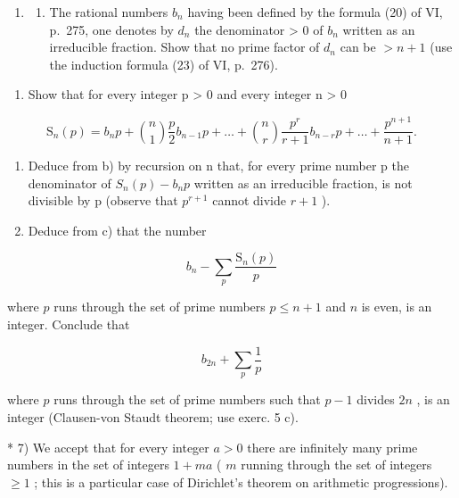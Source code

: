 \begin{enumerate}
\def\labelenumi{\arabic{enumi})}
\setcounter{enumi}{5}
\tightlist
\item
  \begin{enumerate}
  \def\labelenumii{\alph{enumii})}
  \tightlist
  \item
    The rational numbers \(b_{n}\) having been defined by the formula (20) of VI, p.~275, one denotes by \(d_{n}\) the denominator \textgreater{} 0 of \(b_{n}\) written as an irreducible fraction. Show that no prime factor of \(d_{n}\) can be \(> n + 1\) (use the induction formula (23) of VI, p.~276).
  \end{enumerate}
\end{enumerate}

\begin{enumerate}
\def\labelenumi{\alph{enumi})}
\setcounter{enumi}{1}
\tightlist
\item
  Show that for every integer p \textgreater{} 0 and every integer n \textgreater{} 0
\end{enumerate}

\[
\mathrm{S} _ {n} (p) = b _ {n} p + \binom {n} {1} \frac {p}{2} b _ {n - 1} p + \dots + \binom {n} {r} \frac {p ^ {r}}{r + 1} b _ {n - r} p + \dots + \frac {p ^ {n + 1}}{n + 1}.
\]

\begin{enumerate}
\def\labelenumi{\alph{enumi})}
\setcounter{enumi}{2}
\item
  Deduce from b) by recursion on n that, for every prime number p the denominator of \(S_{n}(p) - b_{n}p\) written as an irreducible fraction, is not divisible by p (observe that \(p^{r+1}\) cannot divide \(r + 1\) ).
\item
  Deduce from c) that the number
\end{enumerate}

\[
b _ {n} - \sum_ {p} \frac {\mathrm{S} _ {n} (p)}{p}
\]

where \(p\) runs through the set of prime numbers \(p \leqslant n + 1\) and \(n\) is even, is an integer. Conclude that

\[
b _ {2 n} + \sum_ {p} \frac {1}{p}
\]

where \(p\) runs through the set of prime numbers such that \(p - 1\) divides \(2n\) , is an integer (Clausen-von Staudt theorem; use exerc. 5 c).

* 7) We accept that for every integer \(a > 0\) there are infinitely many prime numbers in the set of integers \(1 + ma\) ( \(m\) running through the set of integers \(\geqslant 1\) ; this is a particular case of Dirichlet's theorem on arithmetic progressions).

